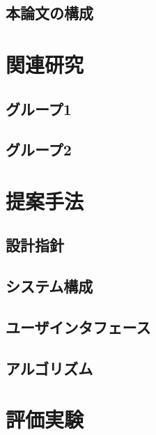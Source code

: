 \documentclass[12pt,a4j]{jreport}
\begin{document}
\section{本論文の構成}



\chapter{関連研究}

\section{グループ1}

\section{グループ2}




\chapter{提案手法}

\section{設計指針}

\section{システム構成}

\section{ユーザインタフェース}

\section{アルゴリズム}




\chapter{評価実験}
\end{document}
